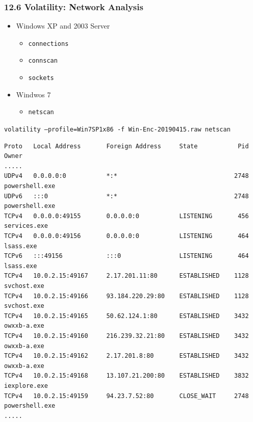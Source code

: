 \begin{frame}[fragile]
  \frametitle{12.6 Volatility: Network Analysis}
    \begin{itemize}
        \item Windows XP and 2003 Server
            \begin{itemize}
                \item \texttt{connections}
                \item \texttt{connscan}
                \item \texttt{sockets}
            \end{itemize}
        \item Windwos 7
            \begin{itemize}
                \item \texttt{netscan}
            \end{itemize}
    \end{itemize}
    \texttt{\footnotesize volatility --profile=Win7SP1x86 -f Win-Enc-20190415.raw netscan}
    \begin{lstlisting}[basicstyle=\tiny]
Proto   Local Address       Foreign Address     State           Pid     Owner
.....
UDPv4   0.0.0.0:0           *:*                                2748     powershell.exe 
UDPv6   :::0                *:*                                2748     powershell.exe
TCPv4   0.0.0.0:49155       0.0.0.0:0           LISTENING       456     services.exe
TCPv4   0.0.0.0:49156       0.0.0.0:0           LISTENING       464     lsass.exe
TCPv6   :::49156            :::0                LISTENING       464     lsass.exe
TCPv4   10.0.2.15:49167     2.17.201.11:80      ESTABLISHED    1128     svchost.exe
TCPv4   10.0.2.15:49166     93.184.220.29:80    ESTABLISHED    1128     svchost.exe
TCPv4   10.0.2.15:49165     50.62.124.1:80      ESTABLISHED    3432     owxxb-a.exe
TCPv4   10.0.2.15:49160     216.239.32.21:80    ESTABLISHED    3432     owxxb-a.exe
TCPv4   10.0.2.15:49162     2.17.201.8:80       ESTABLISHED    3432     owxxb-a.exe
TCPv4   10.0.2.15:49168     13.107.21.200:80    ESTABLISHED    3832     iexplore.exe
TCPv4   10.0.2.15:49159     94.23.7.52:80       CLOSE_WAIT     2748     powershell.exe
.....
    \end{lstlisting}
\end{frame}


